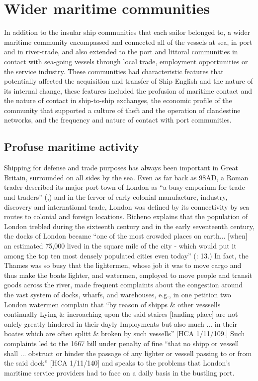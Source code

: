 \section{{Wider} {maritime} {communities}}%

In addition to the insular ship communities that each sailor belonged to, a wider maritime community encompassed and connected all of the vessels at sea, in port and in river-trade, and also extended to the port and littoral communities in contact with sea-going vessels through local trade, employment opportunities or the service industry. These communities had characteristic features that potentially affected the acquisition and transfer of Ship English and the nature of its internal change, these features included the profusion of maritime contact and the nature of contact in ship-to-ship exchanges, the economic profile of the community that supported a culture of theft and the operation of clandestine networks, and the frequency and nature of contact with port communities. 

\subsection{{Profuse} {maritime} {activity}}%

Shipping for defense and trade purposes has always been important in Great Britain, surrounded on all sides by the sea. Even as far back as 98AD, a Roman trader described its major port town of London as “a busy emporium for trade and traders” (\citealt{Tacitus1913},) and in the fervor of early colonial manufacture, industry, discovery and international trade, London was defined by its connectivity by sea routes to colonial and foreign locations. Bicheno explains that the population of London trebled during the sixteenth century and in the early seventeenth century, the docks of London became “one of the most crowded places on earth... [when] an estimated 75,000 lived in the square mile of the city - which would put it among the top ten most densely populated cities even today” (\citealt{Bicheno2012}: 13.) In fact, the Thames was so busy that the lightermen, whose job it was to move cargo and thus make the boats lighter, and watermen, employed to move people and transit goods across the river, made frequent complaints about the congestion around the vast system of docks, wharfs, and warehouses, e.g., in one petition two London watermen complain that “by reason of shipps \& other vesssells continually Lying \& incroaching upon the said staires [landing place] are not onlely greatly hindered in their dayly Imployments but also much ... in their boates which are often splitt \& broken by such vessells” [HCA 1/11/109.]  Such complaints led to the 1667 bill under penalty of fine “that no shipp or vessell shall ... obstruct or hinder the passage of any lighter or vessell passing to or from the said dock” [HCA 1/11/140] and speaks to the problems that London’s maritime service providers had to face on a daily basis in the bustling port. 

